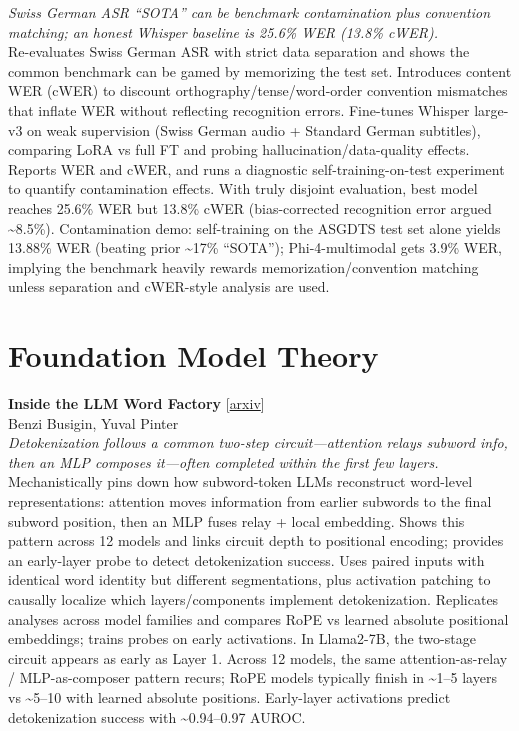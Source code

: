 \documentclass[12pt,letterpaper]{article}
\begin{document}
{\small\textit{Swiss German ASR ``SOTA'' can be benchmark contamination plus convention matching; an honest Whisper baseline is 25.6\% WER (13.8\% cWER).}}\\[1pt]
{\footnotesize Re-evaluates Swiss German ASR with strict data separation and shows the common benchmark can be gamed by memorizing the test set. Introduces content WER (cWER) to discount orthography/tense/word-order convention mismatches that inflate WER without reflecting recognition errors. Fine-tunes Whisper large-v3 on weak supervision (Swiss German audio + Standard German subtitles), comparing LoRA vs full FT and probing hallucination/data-quality effects. Reports WER and cWER, and runs a diagnostic self-training-on-test experiment to quantify contamination effects. With truly disjoint evaluation, best model reaches 25.6\% WER but 13.8\% cWER (bias-corrected recognition error argued \textasciitilde{}8.5\%). Contamination demo: self-training on the ASGDTS test set alone yields 13.88\% WER (beating prior \textasciitilde{}17\% ``SOTA''); Phi-4-multimodal gets 3.9\% WER, implying the benchmark heavily rewards memorization/convention matching unless separation and cWER-style analysis are used.}

\medskip


\section*{Foundation Model Theory}

{\small\textbf{Inside the LLM Word Factory}} {\scriptsize[\href{https://arxiv.org/abs/2606.08562}{arxiv}]}\\
{\scriptsize Benzi Busigin, Yuval Pinter}\\

{\small\textit{Detokenization follows a common two-step circuit---attention relays subword info, then an MLP composes it---often completed within the first few layers.}}\\[1pt]
{\footnotesize Mechanistically pins down how subword-token LLMs reconstruct word-level representations: attention moves information from earlier subwords to the final subword position, then an MLP fuses relay + local embedding. Shows this pattern across 12 models and links circuit depth to positional encoding; provides an early-layer probe to detect detokenization success. Uses paired inputs with identical word identity but different segmentations, plus activation patching to causally localize which layers/components implement detokenization. Replicates analyses across model families and compares RoPE vs learned absolute positional embeddings; trains probes on early activations. In Llama2-7B, the two-stage circuit appears as early as Layer 1. Across 12 models, the same attention-as-relay / MLP-as-composer pattern recurs; RoPE models typically finish in \textasciitilde{}1--5 layers vs \textasciitilde{}5--10 with learned absolute positions. Early-layer activations predict detokenization success with \textasciitilde{}0.94--0.97 AUROC.}
\end{document}
